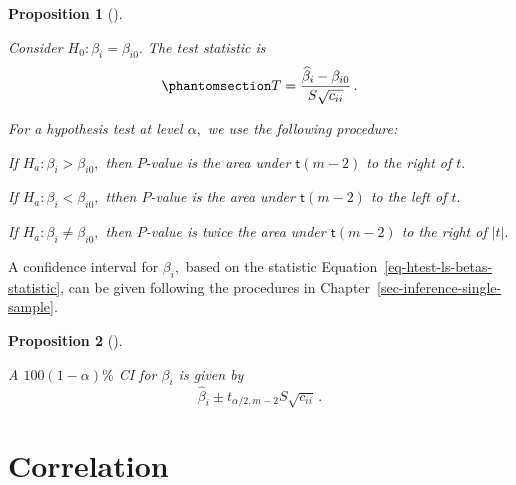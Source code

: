 \documentclass[
  a4paper,
  DIV=11,
  numbers=noendperiod,
  oneside]{scrreprt}
\theoremstyle{definition}
\theoremstyle{definition}
\theoremstyle{plain}
\newtheorem{proposition}{Proposition}[chapter]
\theoremstyle{plain}
\theoremstyle{definition}
\theoremstyle{remark}
\begin{document}
\begin{proposition}[]\protect\hypertarget{prp-htest-ls-betas}{}\label{prp-htest-ls-betas}

Consider \(H_0 : \beta_i = \beta_{i0}.\) The test statistic is
\begin{equation}\phantomsection\label{eq-htest-ls-betas-statistic}{
 T = \frac{\widehat{\beta}_i - \beta_{i0}}{S\sqrt{c_{ii}}} \,.
}\end{equation}

For a hypothesis test at level \(\alpha,\) we use the following
procedure:

If \(H_a : \beta_i > \beta_{i0},\) then \(P\)-value is the area under
\(\mathsf{t}(m-2)\) to the right of \(t.\)

If \(H_a : \beta_i < \beta_{i0},\) tthen \(P\)-value is the area under
\(\mathsf{t}(m-2)\) to the left of \(t.\)

If \(H_a : \beta_i \neq \beta_{i0},\) then \(P\)-value is twice the area
under \(\mathsf{t}(m-2)\) to the right of \(|t|.\)

\end{proposition}

A confidence interval for \(\beta_i,\) based on the statistic
Equation~\ref{eq-htest-ls-betas-statistic}, can be given following the
procedures in Chapter~\ref{sec-inference-single-sample}.

\begin{proposition}[]\protect\hypertarget{prp-ci-ls-betas}{}\label{prp-ci-ls-betas}

A \(100(1-\alpha)\%\) CI for \(\beta_i\) is given by \[
 \widehat{\beta}_i \pm t_{\alpha/2, m-2} S \sqrt{c_{ii}} \,.
\]

\end{proposition}

\section{Correlation}\label{sec-correlation}
\end{document}
